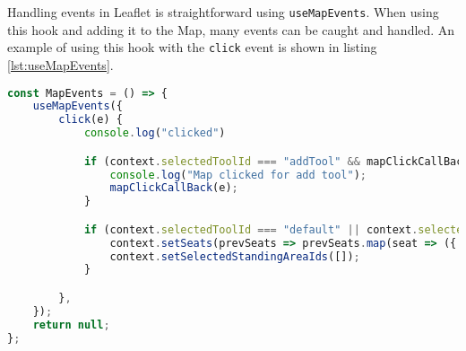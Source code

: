 Handling events in Leaflet is straightforward using \texttt{useMapEvents}. When using this hook and adding it to the Map, many events can be caught and handled. An example of using this hook with the \texttt{click} event is shown in listing \ref{lst:useMapEvents}.

\begin{lstlisting}[language=Typescript, caption={Handling Events in Leaflet},label={lst:useMapEvents}]
const MapEvents = () => {
    useMapEvents({
        click(e) {
            console.log("clicked")

            if (context.selectedToolId === "addTool" && mapClickCallBack) {
                console.log("Map clicked for add tool");
                mapClickCallBack(e);
            }

            if (context.selectedToolId === "default" || context.selectedToolId === "") {
                context.setSeats(prevSeats => prevSeats.map(seat => ({ ...seat, selected: false })));
                context.setSelectedStandingAreaIds([]);
            }

        },
    });
    return null;
};
\end{lstlisting}
